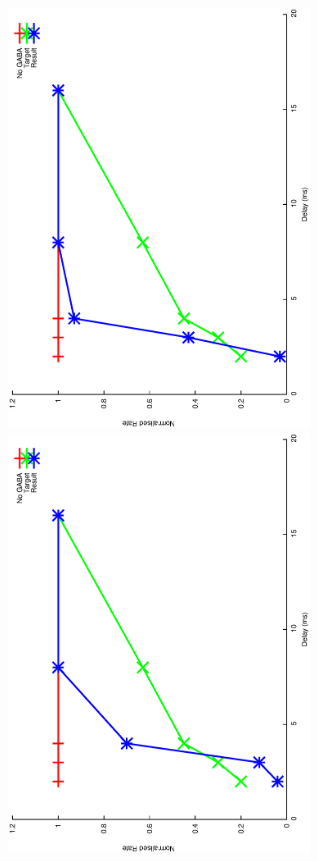 \documentclass{article}
\begin{document}
\includegraphics[keepaspectratio=true,angle=-90,width=0.6\textwidth]{DS_ClickRecovery_result.12.eps}\clearpage
\includegraphics[keepaspectratio=true,angle=-90,width=0.6\textwidth]{DS_ClickRecovery_result.13.eps}\clearpage
\end{document}
